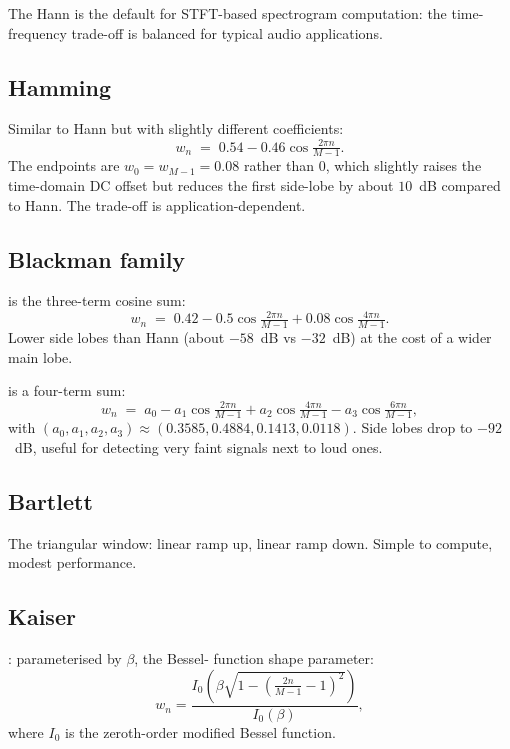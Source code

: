 The Hann is the default for STFT-based spectrogram computation:
the time-frequency trade-off is balanced for typical audio
applications.

\subsection{Hamming}
\label{ssec:signal_windows:hamming}

Similar to Hann but with slightly different coefficients:
\[
w_n \;=\; 0.54 - 0.46 \cos \tfrac{2\pi n}{M-1}.
\]
The endpoints are $w_0 = w_{M-1} = 0.08$ rather than $0$, which
slightly raises the time-domain DC offset but reduces the first
side-lobe by about $10$~dB compared to Hann. The trade-off is
application-dependent.

\subsection{Blackman family}
\label{ssec:signal_windows:blackman}

 is the three-term cosine sum:
\[
w_n \;=\; 0.42 - 0.5 \cos \tfrac{2\pi n}{M-1}
       + 0.08 \cos \tfrac{4\pi n}{M-1}.
\]
Lower side lobes than Hann (about $-58$~dB vs $-32$~dB) at the
cost of a wider main lobe.

 is a four-term sum:
\[
w_n \;=\; a_0 - a_1 \cos \tfrac{2\pi n}{M-1}
       + a_2 \cos \tfrac{4\pi n}{M-1}
       - a_3 \cos \tfrac{6\pi n}{M-1},
\]
with $(a_0, a_1, a_2, a_3) \approx (0.3585, 0.4884, 0.1413,
0.0118)$. Side lobes drop to $-92$~dB, useful for detecting very
faint signals next to loud ones.

\subsection{Bartlett}
\label{ssec:signal_windows:bartlett}

The triangular window: linear ramp up, linear ramp down. Simple
to compute, modest performance.

\subsection{Kaiser}
\label{ssec:signal_windows:kaiser}

: parameterised by $\beta$, the Bessel-
function shape parameter:
\[
w_n = \frac{I_0\left(\beta \sqrt{1 - \left(\frac{2n}{M-1} -
1\right)^2}\right)}{I_0(\beta)},
\]
where $I_0$ is the zeroth-order modified Bessel function.

